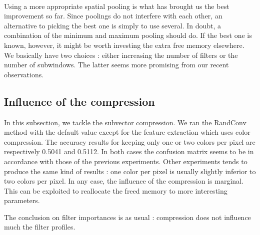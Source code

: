 \documentclass[a4paper]{report}
\begin{document}
	
	\paragraph{}
	Using a more appropriate spatial pooling is what has brought us the best improvement so far. Since poolings do not interfere with each other, an alternative to picking the best one is simply to use several. In doubt, a combination of the minimum and maximum pooling should do. If the best one is known, however, it might be worth investing the extra free memory elsewhere. We basically have two choices : either increasing the number of filters or the number of subwindows. The latter seems more promising from our recent observations.
	
	
	
	\subsection{Influence of the compression}
	In this subsection, we tackle the subvector compression. We ran the RandConv method with the default value except for the feature extraction which uses color compression. The accuracy results for keeping only one or two colors per pixel are respectively 0.5041 and 0.5112. In both cases the confusion matrix seems to be in accordance with those of the previous experiments. Other experiments tends to produce the same kind of results : one color per pixel is usually slightly inferior to two colors per pixel. In any case, the influence of the compression is marginal. This can be exploited to reallocate the freed memory to more interesting parameters.
	\par
	The conclusion on filter importances is as usual : compression does not influence much the filter profiles.
	
\end{document}

